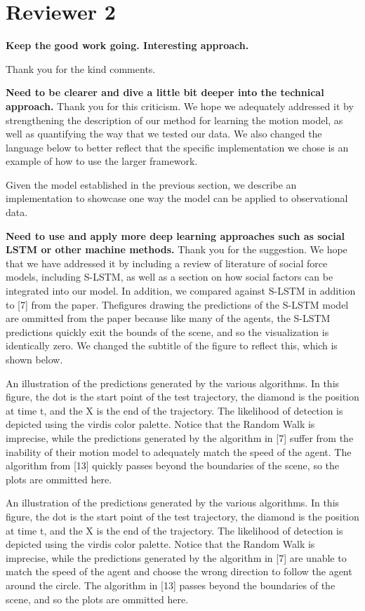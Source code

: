 \documentclass[usenames,dvipsnames]{article}
\providecommand{\response}[1]{
\noindent
\noindent\colorbox{gray!20}{
\parbox{\textwidth}{
\setlength{\parskip}{.1in}
\setlength{\parindent}{.1in}
#1}
}
}
\begin{document}
\section*{Reviewer 2}
\begin{enumerate}
\begin{item}
\textbf{Keep the good work going. Interesting approach.}
\end{item}

Thank you for the kind comments.
\begin{item}
\textbf{
Need to be clearer and
dive a little bit deeper into the technical approach. }
Thank you for this criticism. We hope we adequately addressed it by strengthening the description of our method for learning the motion model, as well as quantifying the way that we tested our data. We also changed the language below to better reflect that the specific implementation we chose is an example of how to use the larger framework.

\response{Given the model established in the previous section, we describe an implementation to showcase one way the model can be applied to observational data.}
\end{item}
\begin{item}
\textbf{
Need to use and apply more deep learning approaches such as social LSTM
or other machine methods.}
Thank you for the suggestion. We hope that we have addressed it by including a review of literature of social force models, including S-LSTM, as well as a section on how social factors can be integrated into our model. In addition, we compared against S-LSTM in addition to [7] from the paper. Thefigures drawing the predictions of the S-LSTM model are ommitted from the paper because like many of the agents, the S-LSTM predictions quickly exit the bounds of the scene, and so the visualization is identically zero. We changed the subtitle of the figure to reflect this, which is shown below.

\response{An illustration of the predictions generated by the various algorithms. In this figure, the dot is the start point of the test trajectory, the diamond is the position at time t, and the X is the end of the trajectory. The likelihood of detection is depicted using the virdis color palette. Notice that the Random Walk is imprecise, while the predictions generated by the algorithm in [7] suffer from the inability of their motion model to adequately match the speed of the agent. The algorithm from [13] quickly passes beyond the boundaries of the scene, so the plots are ommitted here.
}
\response{An illustration of the predictions generated by the various algorithms. In this figure, the dot is the start point of the test trajectory, the diamond is the position at time t, and the X is the end of the trajectory. The likelihood of detection is depicted using the virdis color palette. Notice that the Random Walk is imprecise, while the predictions generated by the algorithm in [7] are unable to match the speed of the agent and choose the wrong direction to follow the agent around the circle. The algorithm in [13] passes beyond the boundaries of the scene, and so the plots are ommitted here.}


\end{item}
\end{enumerate}
\end{document}
